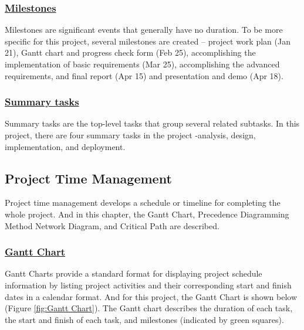 \documentclass{article}
\begin{document}
\subsubsection*{\underline{Milestones}}
Milestones are significant events that generally have no duration. To be more specific for this project, several milestones are created -- project work plan (Jan 21), Gantt chart and progress check form (Feb 25), accomplishing the implementation of basic requirements (Mar 25), accomplishing the advanced requirements, and final report (Apr 15) and presentation and demo (Apr 18).
\subsubsection*{\underline{Summary tasks}}
Summary tasks are the top-level tasks that group several related subtasks. In this project, there are four summary tasks in the project -analysis, design, implementation, and deployment.
\begin{list}{}{\leftmargin=1em}
    \item \subsection*{Project Time Management}
\end{list}
Project time management develops a schedule or timeline for completing the whole project. And in this chapter, the Gantt Chart, Precedence Diagramming Method Network Diagram, and Critical Path are described.\\\subsubsection*{\underline {Gantt Chart}}
Gantt Charts provide a standard format for displaying project schedule information by listing project activities and their corresponding start and finish dates in a calendar format. And for this project, the Gantt Chart is shown below (Figure \ref{fig:Gantt Chart}). The Gantt chart describes the duration of each task, the start and finish of each task, and milestones (indicated by green squares).
\end{document}
